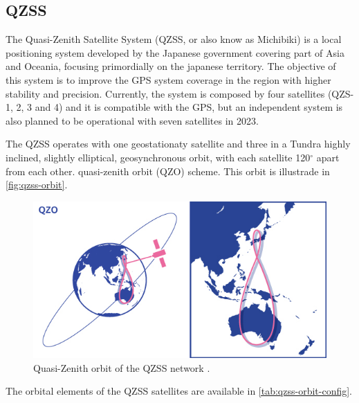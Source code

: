 \subsection{QZSS}

The Quasi-Zenith Satellite System \cite{qzss} (QZSS, or also know as Michibiki) is a local positioning system developed by the Japanese government covering part of Asia and Oceania, focusing primordially on the japanese territory. The objective of this system is to improve the GPS system coverage in the region with higher stability and precision. Currently, the system is composed by four satellites (QZS-1, 2, 3 and 4) and it is compatible with the GPS, but an independent system is also planned to be operational with seven satellites in 2023.

The QZSS operates with one geostationaty satellite and three in a Tundra highly inclined, slightly elliptical, geosynchronous orbit, with each satellite 120$^{\circ}$ apart from each other. quasi-zenith orbit (QZO) scheme. This orbit is illustrade in \autoref{fig:qzss-orbit}.

\begin{figure}[!ht]
    \begin{center}
        \includegraphics[width=0.8\columnwidth]{figures/qzss-orbit}
        \caption{Quasi-Zenith orbit of the QZSS network \cite{qzss}.}
        \label{fig:qzss-orbit}
    \end{center}
\end{figure}

The orbital elements of the QZSS satellites are available in \autoref{tab:qzss-orbit-config}.

